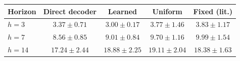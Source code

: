\begin{tabular}{lcccc}
\hline
Horizon & Direct decoder & Learned & Uniform & Fixed (lit.) \\
\hline
$h=3$ & $3.37 \pm 0.71$ & $\mathbf{3.00 \pm 0.17}$ & $3.77 \pm 1.46$ & $3.83 \pm 1.17$ \\
$h=7$ & $\mathbf{8.56 \pm 0.85}$ & $9.01 \pm 0.84$ & $9.70 \pm 1.16$ & $9.99 \pm 1.54$ \\
$h=14$ & $\mathbf{17.24 \pm 2.44}$ & $18.88 \pm 2.25$ & $19.11 \pm 2.04$ & $18.38 \pm 1.63$ \\
\hline
\end{tabular}
